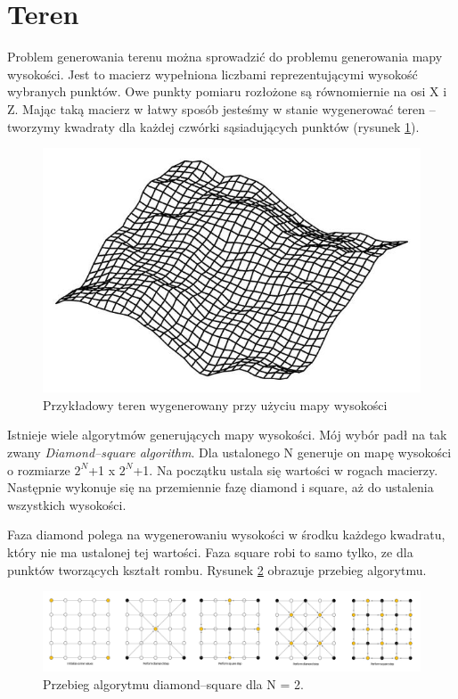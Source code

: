 \documentclass[inz,longabstract]{iithesis}
\begin{document}
    \section{Teren}
        Problem generowania terenu można sprowadzić do problemu generowania mapy wysokości. Jest to macierz wypełniona liczbami reprezentującymi wysokość wybranych punktów. Owe punkty pomiaru rozłożone są równomiernie na osi X i Z. Mając taką macierz w łatwy sposób jesteśmy w stanie wygenerować teren -- tworzymy kwadraty dla każdej czwórki sąsiadujących punktów (rysunek \ref{fig:heightmap}). 
        \begin{figure}[H]
            \includegraphics[width=\linewidth]{heightmap.png}
            \caption{Przykładowy teren wygenerowany przy użyciu mapy wysokości \cite{heightmap}} 
            \label{fig:heightmap}
        \end{figure}
        
        Istnieje wiele algorytmów generujących mapy wysokości. Mój wybór padł na tak zwany \textit{Diamond--square algorithm}. Dla ustalonego N generuje on mapę wysokości o rozmiarze $2^N$+1 x $2^N$+1. Na początku ustala się wartości w rogach macierzy. Następnie wykonuje się na przemiennie fazę diamond i square, aż do ustalenia wszystkich wysokości. 
        
        Faza diamond polega na wygenerowaniu wysokości w środku każdego kwadratu, który nie ma ustalonej tej wartości. Faza square robi to samo tylko, ze dla punktów tworzących kształt rombu. Rysunek \ref{fig:diamondSquare} obrazuje przebieg algorytmu. 
        \begin{figure}[H]
            \includegraphics[width=\linewidth]{diamondSquare.png}
            \caption{Przebieg algorytmu diamond--square dla N = 2.} 
            \label{fig:diamondSquare}
        \end{figure}
        
\end{document}

